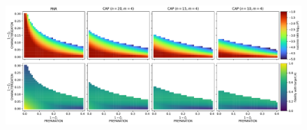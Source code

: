 \documentclass{article}
\begin{document}


\begin{figure}[h]
  \begin{center}
    \includegraphics[width = \columnwidth]{import/202411/paper_unified_04.pdf}
  \end{center}
  \caption{
  }
  \label{f-otm-4}
\end{figure}
\end{document}
